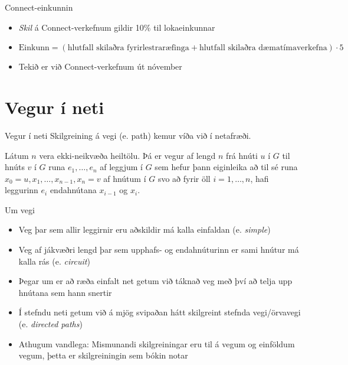 \documentclass{beamer}
\begin{document}
\begin{frame}{Connect-einkunnin}
\begin{itemize}
 \item \emph{Skil} á Connect-verkefnum gildir 10\% til lokaeinkunnar
 \item $\text{Einkunn} = (\text{hlutfall skilaðra fyrirlestraræfinga} + \text{hlutfall skilaðra dæmatímaverkefna}) \cdot 5$
 \item Tekið er við Connect-verkefnum út nóvember
\end{itemize}
\end{frame}

\section{Vegur í neti}

\begin{frame}{Vegur í neti}
Skilgreining á vegi (e.  path) kemur víða við í netafræði.

\begin{tcolorbox}[title=Vegur]
Látum $n$ vera ekki-neikvæða heiltölu. Þá er vegur af lengd $n$ frá hnúti $u$ í $G$ til hnúts $v$ í $G$ runa $e_1, \ldots, e_n$ af leggjum í $G$ sem hefur þann eiginleika að til sé runa $x_0 = u, x_1, \ldots, x_{n-1}, x_n = v$ af hnútum í $G$ svo að fyrir öll $i = 1, \ldots, n$, hafi leggurinn $e_i$ endahnútana $x_{i-1}$ og $x_i$.
\end{tcolorbox}
\end{frame}

\begin{frame}{Um vegi}
\begin{itemize}
 \item Veg þar sem allir leggirnir eru aðskildir má kalla einfaldan (e. \emph{simple})
 \item Veg af jákvæðri lengd þar sem upphafs- og endahnúturinn er sami hnútur má kalla rás (e. \emph{circuit})
 \item Þegar um er að ræða einfalt net getum við táknað veg með því að telja upp hnútana sem hann snertir
 \item Í stefndu neti getum við á mjög svipaðan hátt skilgreint stefnda vegi/örvavegi (e. \emph{directed paths})
 \item Athugum vandlega: Mismunandi skilgreiningar eru til á vegum og einföldum vegum, þetta er skilgreiningin sem bókin notar
\end{itemize}
\end{frame}
\end{document}

